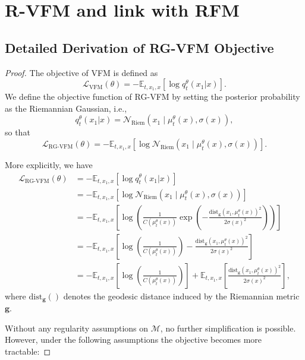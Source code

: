 \section{R-VFM and link with RFM}

\subsection{Detailed Derivation of RG-VFM Objective}\label{sec:rvfm}
\rgvfm*

\begin{proof}
    
The objective of VFM is defined as  
$$
\mathcal{L}_{\text{VFM}} (\theta) = -\mathbb{E}_{t,x_1,x}\left[\log q_t^{\theta}(x_1 | x)\right].
$$  
We define the objective function of RG-VFM by setting the posterior probability as the Riemannian Gaussian, i.e.,  
$$
q_t^{\theta}(x_1 | x) = \mathcal{N}_{\text{Riem}}(x_1 \mid \mu_t^{\theta}(x), \sigma(x)),
$$  
so that  
$$
\mathcal{L}_{\text{RG-VFM}} (\theta) = -\mathbb{E}_{t,x_1,x}\left[\log \mathcal{N}_{\text{Riem}}(x_1 \mid \mu_t^{\theta}(x), \sigma(x))\right].
$$  

More explicitly, we have  
$$
\begin{aligned}
\mathcal{L}_{\text{RG-VFM}} (\theta) &= -\mathbb{E}_{t,x_1,x}\left[\log q_t^{\theta}(x_1 | x)\right] \\
&= -\mathbb{E}_{t,x_1,x}\left[\log \mathcal{N}_{\text{Riem}}(x_1 \mid \mu_t^{\theta}(x), \sigma(x))\right] \\
&= -\mathbb{E}_{t,x_1,x}\left[\log \left( \frac{1}{C(\mu_t^{\theta}(x))} \exp\left(-\frac{\text{dist}_{\mathbf{g}}(x_1, \mu_t^{\theta}(x))^2}{2\sigma(x)^2}\right)\right)\right] \\
&= -\mathbb{E}_{t,x_1,x}\left[\log \left( \frac{1}{C(\mu_t^{\theta}(x))} \right) -\frac{\text{dist}_{\mathbf{g}}(x_1, \mu_t^{\theta}(x))^2}{2\sigma(x)^2}\right] \\
&= -\mathbb{E}_{t,x_1,x}\left[\log \left( \frac{1}{C(\mu_t^{\theta}(x))} \right)\right] + \mathbb{E}_{t,x_1,x}\left[\frac{\text{dist}_{\mathbf{g}}(x_1, \mu_t^{\theta}(x))^2}{2\sigma(x)^2}\right],
\end{aligned}
$$  
where $\text{dist}_{\mathbf{g}}()$ denotes the geodesic distance induced by the Riemannian metric $\mathbf{g}$.

Without any regularity assumptions on $\mathcal{M}$, no further simplification is possible. However, under the following assumptions the objective becomes more tractable:


\end{proof}
